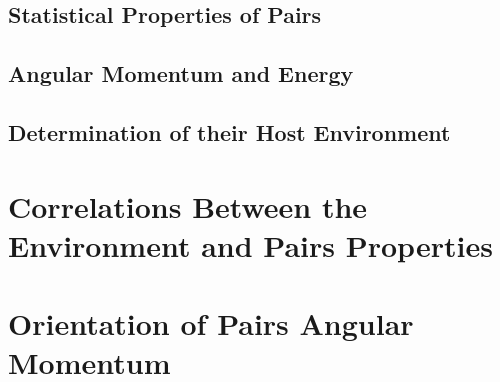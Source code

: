 	\subsection{Statistical Properties of Pairs}
	\label{subsec:StatisticalPropertiesOfPairs}


	\subsection{Angular Momentum and Energy}
	\label{subsec:AngularMomentumAndEnergy}


	\subsection{Determination of their Host Environment}
	\label{subsec:DeterminationOfTheirHostEnvironment}
	
	



\section{Correlations Between the Environment and Pairs Properties}
\label{sec:CorrelationsBetweenTheEnvironmentAndPairsProperties}




\section{Orientation of Pairs Angular Momentum}
\label{sec:OrientationOfPairsAngularMomentum}

